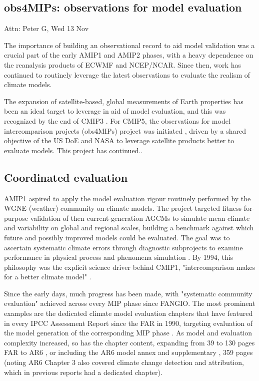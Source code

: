 \documentclass[gmd, preprint]{copernicus}
\def\cred#1{{\color{red}#1}}
\begin{document}
\subsection{obs4MIPs: observations for model evaluation}
\cred{Attn: Peter G, Wed 13 Nov}

The importance of building an observational record to aid model validation was a crucial part of the early AMIP1 \citep{gates_amip_1992} and AMIP2 \citep{gleckler_amip_1996-1} phases, with a heavy dependence on the reanalysis products of ECWMF and NCEP/NCAR. Since then, work has continued to routinely leverage the latest observations to evaluate the realism of climate models.

The expansion of satellite-based, global measurements of Earth properties has been an ideal target to leverage in aid of model evaluation, and this was recognized by the end of CMIP3 \citep{gleckler_improving_2011,teixeira_satellite_2011}. For CMIP5, the observations for model intercomparison projects (obs4MIPs) project was initiated \citep{teixeira_satellite_2014}, driven by a shared objective of the US DoE and NASA to leverage satellite products better to evaluate models. \cred{This project has continued.. \citep{waliser_observations_2020}}



\subsection{Coordinated evaluation}

AMIP1 aspired to apply the model evaluation rigour routinely performed by the WGNE (weather) community on climate models. The project targeted fitness-for-purpose validation of then current-generation AGCMs to simulate mean climate and variability on global and regional scales, building a benchmark against which future and possibly improved models could be evaluated. The goal was to ascertain systematic climate errors through diagnostic subprojects to examine performance in physical process and phenomena simulation \citep{gates_ams_1992}. By 1994, this philosophy was the explicit science driver behind CMIP1, "intercomparison makes for a better climate model" \citep{meehl_intercomparison_1997}.

Since the early days, much progress has been made, with "systematic community evaluation" achieved across every MIP phase since FANGIO. The most prominent examples are the dedicated climate model evaluation chapters that have featured in every IPCC Assessment Report since the FAR in 1990, targeting evaluation of the model generation of the corresponding MIP phase \citep[e.g.,][]{gates_validation_1990,gates_climate_1996,mcavaney_model_2001,randall_climate_2007,flato_evaluation_2013,eyring_human_2021}. As model and evaluation complexity increased, so has the chapter content, expanding from 39 to 130 pages FAR to AR6  \citep{gates_validation_1990,eyring_human_2021}, or including the AR6 model annex \citep{gutierrez_models_2021} and supplementary \citep{eyring_human_2021-1}, 359 pages (noting AR6 Chapter 3 also covered climate change detection and attribution, which in previous reports had a dedicated chapter).
\end{document}
